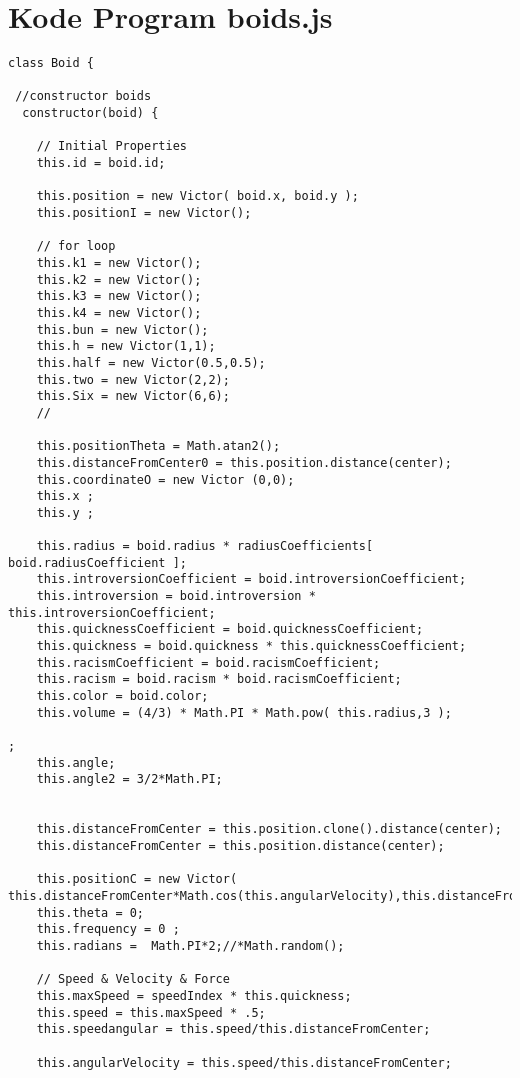 \section{Kode Program boids.js}
\begin{lstlisting}
class Boid {

 //constructor boids
  constructor(boid) {

    // Initial Properties
    this.id = boid.id;

    this.position = new Victor( boid.x, boid.y );
    this.positionI = new Victor();

    // for loop
    this.k1 = new Victor();
    this.k2 = new Victor();
    this.k3 = new Victor();
    this.k4 = new Victor();
    this.bun = new Victor();
    this.h = new Victor(1,1);
    this.half = new Victor(0.5,0.5);
    this.two = new Victor(2,2);
    this.Six = new Victor(6,6);
    //

    this.positionTheta = Math.atan2();
    this.distanceFromCenter0 = this.position.distance(center);
    this.coordinateO = new Victor (0,0);
    this.x ;
    this.y ;

    this.radius = boid.radius * radiusCoefficients[ boid.radiusCoefficient ];
    this.introversionCoefficient = boid.introversionCoefficient;
    this.introversion = boid.introversion * this.introversionCoefficient;
    this.quicknessCoefficient = boid.quicknessCoefficient;
    this.quickness = boid.quickness * this.quicknessCoefficient;
    this.racismCoefficient = boid.racismCoefficient;
    this.racism = boid.racism * boid.racismCoefficient;
    this.color = boid.color;
    this.volume = (4/3) * Math.PI * Math.pow( this.radius,3 );

;
    this.angle;
    this.angle2 = 3/2*Math.PI;    


    this.distanceFromCenter = this.position.clone().distance(center);
    this.distanceFromCenter = this.position.distance(center);

    this.positionC = new Victor( this.distanceFromCenter*Math.cos(this.angularVelocity),this.distanceFromCenter*Math.sin(this.angularVelocity));
    this.theta = 0; 
    this.frequency = 0 ;
    this.radians =  Math.PI*2;//*Math.random();

    // Speed & Velocity & Force
    this.maxSpeed = speedIndex * this.quickness;
    this.speed = this.maxSpeed * .5;
    this.speedangular = this.speed/this.distanceFromCenter;

    this.angularVelocity = this.speed/this.distanceFromCenter;
 

\end{lstlisting}
